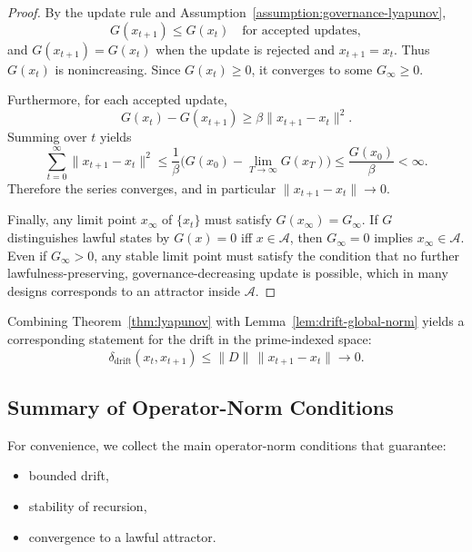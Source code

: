 \documentclass[11pt]{article}
\begin{document}
\begin{proof}
By the update rule and Assumption~\ref{assumption:governance-lyapunov},
\[
  G(x_{t+1}) \le G(x_t) \quad \text{for accepted updates},
\]
and \(G(x_{t+1}) = G(x_t)\) when the update is rejected and \(x_{t+1} = x_t\).%
Thus \(G(x_t)\) is nonincreasing.%
Since \(G(x_t)\ge 0\), it converges to some \(G_\infty \ge 0\).

Furthermore, for each accepted update,
\[
  G(x_t) - G(x_{t+1}) \ge \beta \|x_{t+1} - x_t\|^2.
\]
Summing over \(t\) yields
\[
  \sum_{t=0}^\infty \|x_{t+1} - x_t\|^2
  \le
  \frac{1}{\beta} \bigl(G(x_0) - \lim_{T\to\infty} G(x_T)\bigr)
  \le
  \frac{G(x_0)}{\beta} < \infty.
\]
Therefore the series converges, and in particular \(\|x_{t+1} - x_t\| \to 0\).%

Finally, any limit point \(x_\infty\) of \(\{x_t\}\) must satisfy \(G(x_\infty) = G_\infty\).%
If \(G\) distinguishes lawful states by \(G(x) = 0\) iff \(x \in \mathcal{A}\), then \(G_\infty = 0\) implies \(x_\infty \in \mathcal{A}\).%
Even if \(G_\infty > 0\), any stable limit point must satisfy the condition that no further lawfulness-preserving, governance-decreasing update is possible, which in many designs corresponds to an attractor inside \(\mathcal{A}\).%
\end{proof}

Combining Theorem~\ref{thm:lyapunov} with Lemma~\ref{lem:drift-global-norm} yields a corresponding statement for the drift in the prime-indexed space:
\[
  \delta_{\mathrm{drift}}(x_t, x_{t+1})
  \le \|D\|\,\|x_{t+1} - x_t\| \to 0.
\]

\subsection{Summary of Operator-Norm Conditions}

For convenience, we collect the main operator-norm conditions that guarantee:
\begin{itemize}
  \item bounded drift,
  \item stability of recursion,
  \item convergence to a lawful attractor.
\end{itemize}
\end{document}
